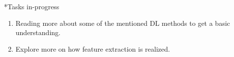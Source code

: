 \documentclass[11pt,a4paper]{article}
\begin{document}
\begin{section}
\begin{refsection}
       \begin{subsection}*{Tasks in-progress}
             \begin{enumerate}
                   \item
                         Reading more about some of the mentioned  DL methods to get a basic understanding.
                   \item
                         Explore more on how feature extraction is realized.
             \end{enumerate}
       \end{subsection}

       \printbibliography
 \end{refsection}
\end{section}

\newpage
\end{document}
